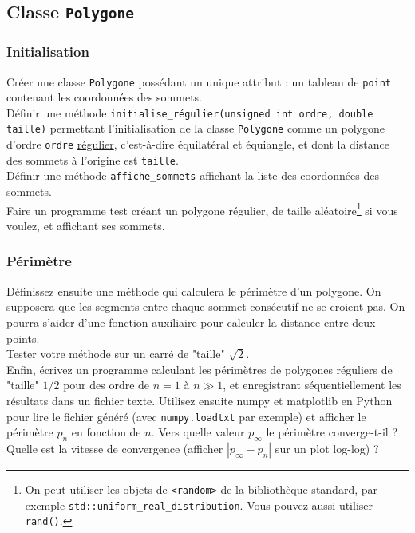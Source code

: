 \documentclass{book}
\newcommand{\inline}[1]{\texttt{#1}}
\begin{document}

\subsection{Classe \texttt{Polygone}}

\subsubsection{Initialisation}
Créer une classe \texttt{Polygone} possédant un unique attribut : un tableau de \texttt{point} contenant les coordonnées des sommets.\\

Définir une méthode \inline{initialise_régulier(unsigned int ordre, double taille)} permettant l'initialisation de la classe \texttt{Polygone} comme un polygone d'ordre \inline{ordre} \href{https://fr.wikipedia.org/wiki/Polygone_r%C3%A9gulier}{régulier}, c'est-à-dire équilatéral et équiangle, et dont la distance des sommets à l'origine est \texttt{taille}.\\

Définir une méthode \inline{affiche_sommets} affichant la liste des coordonnées des sommets.\\

Faire un programme test créant un polygone régulier, de taille aléatoire\footnote{On peut utiliser les objets de \texttt{<random>} de la bibliothèque standard, par exemple \href{https://en.cppreference.com/w/cpp/numeric/random/uniform_real_distribution}{\inline{std::uniform_real_distribution}}. Vous pouvez aussi utiliser \inline{rand()}.} si vous voulez, et affichant ses sommets.

\subsubsection{Périmètre}

Définissez ensuite une méthode qui calculera le périmètre d'un polygone. On supposera que les segments entre chaque sommet consécutif ne se croient pas. On pourra s'aider d'une fonction auxiliaire pour calculer la distance entre deux points.\\

Tester votre méthode sur un carré de "taille" $\sqrt{2}$.\\

Enfin, écrivez un programme calculant les périmètres de polygones réguliers de "taille" $1/2$ pour des ordre de $n=1$ à $n\gg 1$, et enregistrant séquentiellement les résultats dans un fichier texte. Utilisez ensuite numpy et matplotlib en Python pour lire le fichier généré (avec \texttt{numpy.loadtxt} par exemple) et afficher le périmètre $p_n$ en fonction de $n$. Vers quelle valeur $p_\infty$ le périmètre converge-t-il ? Quelle est la vitesse de convergence (afficher $|p_\infty-p_n|$ sur un plot log-log) ?
\end{document}
